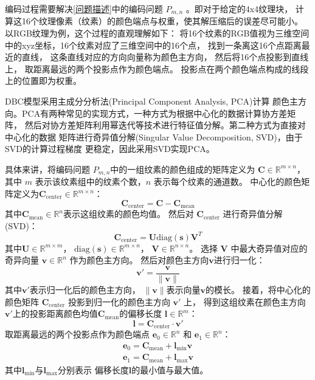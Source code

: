 编码过程需要解决\ref{问题描述}中的编码问题 $P_{m,n}$ 。即对于给定的4x4纹理块，
计算这16个纹理像素（纹素）的颜色端点与权重，使其解压缩后的误差尽可能小。
以RGB纹理为例，这个过程的直观理解如下：
将16个纹素的RGB值视为三维空间中的xyz坐标，16个纹素对应了三维空间中的16个点，
找到一条离这16个点距离最近的直线，
这条直线对应的方向向量称为颜色主方向，
然后将16个点投影到直线上，
取距离最远的两个投影点作为颜色端点。
投影点在两个颜色端点构成的线段上的位置即为权重。

DBC模型采用主成分分析法(Principal Component Analysis, PCA)计算
颜色主方向。PCA有两种常见的实现方式，一种方式为根据中心化的数据计算协方差矩阵，
然后对协方差矩阵利用幂迭代等技术进行特征值分解。第二种方式为直接对中心化的数据
矩阵进行奇异值分解(Singular Value Decomposition, SVD)，由于SVD的计算过程梯度
更稳定，因此采用SVD实现PCA。

具体来讲，将编码问题 $P_{m,n}$中的一组纹素的颜色组成的矩阵定义为
$\mathbf{C}\in\mathbb{R}^{m\times n}$，其中 $m$ 表示该纹素组中的纹素个数，$n$ 表示每个纹素的通道数。
中心化的颜色矩阵定义为$\mathbf{C}_{\text{center}}\in\mathbb{R}^{m\times n}$：
\begin{equation}
\mathbf{C}_{\text{center}}=\mathbf{C}-\mathbf{C}_{\text{mean}}
\end{equation}
其中$\mathbf{C}_{\text{mean}}\in\mathbb{R}^{n}$表示这组纹素的颜色均值。
然后对 $\mathbf{C}_{\text{center}}$ 进行奇异值分解(SVD)：
\begin{equation}
\mathbf{C}_{\text{center}}=\mathbf{U}\text{diag}(\mathbf{s})\mathbf{V}^T
\end{equation}
其中$\mathbf{U}\in \mathbb{R}^{m \times m}$，
$\text{diag}(\mathbf{s})\in\mathbb{R}^{m\times n}$，
$\mathbf{V}\in \mathbb{R}^{n\times n}$。
选择 $\mathbf{V}$ 中最大奇异值对应的奇异向量 $\mathbf{v}\in \mathbb{R}^{n}$ 作为颜色主方向。
然后对颜色主方向$\mathbf{v}$进行归一化：
\begin{equation}
    \mathbf{v}'=\frac{\mathbf{v}}{\|\mathbf{v}\|}
\end{equation}
其中$\mathbf{v}'$表示归一化后的颜色主方向，
$\|\mathbf{v}\|$表示向量$\mathbf{v}$的模长。
接着，将中心化的颜色矩阵 $\mathbf{C}_\text{center}$ 投影到归一化的颜色主方向 $\mathbf{v}'$ 上，
得到这组纹素在颜色主方向$\mathbf{v}'$上的投影距离颜色均值$\mathbf{C}_{\text{mean}}$的偏移长度 $\mathbf{l}\in\mathbb{R}^{m}$：
\begin{equation}
\mathbf{l}=\mathbf{C}_{\text{center}}\cdot\mathbf{v}'
\end{equation}
取距离最远的两个投影点作为颜色端点
$\mathbf{e}_0\in\mathbb{R}^n$ 和 $\mathbf{e}_1\in\mathbb{R}^n$：
\begin{align}
\mathbf{e}_0=\mathbf{C}_{\text{mean}}+\mathbf{l}_\text{min}\mathbf{v}\\
\mathbf{e}_1=\mathbf{C}_{\text{mean}}+\mathbf{l}_\text{max}\mathbf{v}
\end{align}
其中$\mathbf{l}_\text{min}$与$\mathbf{l}_\text{max}$分别表示
偏移长度$\mathbf{l}$的最小值与最大值。

